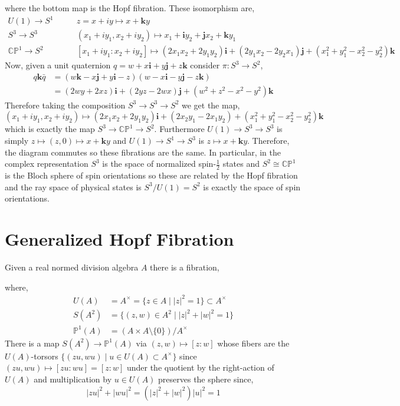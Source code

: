 \documentclass[12pt]{extarticle}
\theoremstyle{definition}
\renewcommand{\bf}[1]{\mathbf{#1}}
\renewcommand{\P}{\mathbb{P}}
\newcommand{\CP}{\mathbb{CP}}
\begin{document}
where the bottom map is the Hopf fibration. These isomorphism are,
\begin{align*}
U(1) \to S^1 \quad & \quad z = x + i y \mapsto x + \bf{k} y 
\\
S^3 \to S^3 \quad & \quad (x_1 + i y_1, x_2 + i y_2) \mapsto x_1 + \bf{i} y_2 + \bf{j} x_2 + \bf{k} y_1
\\
\CP^1 \to S^2 \quad & \quad [x_1 + i y_1 : x_2 + i y_2] \mapsto (2 x_1 x_2 + 2 y_1 y_2) \bf{i} + (2 y_1 x_2 - 2 y_2 x_1) \bf{j} +  (x_1^2 + y_1^2 - x_2^2 - y_2^2) \bf{k}
\end{align*}
Now, given a unit quaternion $q = w + x \bf{i}  + y \bf{j}  + z \bf{k}$ consider $\pi  : S^3 \to S^2$,
\begin{align*}
q \bf{k} \bar{q} & = (w \bf{k} - x \bf{j} + y \bf{i} - z) (w - x \bf{i} - y \bf{j} - z \bf{k})
\\
& = (2 w y + 2 x z) \bf{i} + (2 yz - 2 w x) \bf{j} + (w^2 + z^2 - x^2 - y^2) \bf{k}
\end{align*} 
Therefore taking the composition $S^3 \to S^3 \to S^2$ we get the map,
\[ (x_1 + i y_1, x_2 + i y_2) \mapsto (2 x_1 x_2 + 2 y_1 y_2) \bf{i} + (2 x_2 y_1 - 2 x_1 y_2) + (x_1^2 + y_1^2 - x_2^2 - y_2^2) \bf{k}  \]
which is exactly the map $S^3 \to \CP^1 \to S^2$. Furthermore $U(1) \to S^3 \to S^3$ is simply $z \mapsto (z, 0) \mapsto x + \bf{k} y$ and $U(1) \to S^1 \to S^3$ is $z \mapsto x + \bf{k} y$. Therefore, the diagram commutes so these fibrations are the same. In particular, in the complex representation $S^3$ is the space of normalized spin-$\tfrac{1}{2}$ states and $S^2 \cong \CP^1$ is the Bloch sphere of spin orientations so these are related by the Hopf fibration and the ray space of physical states is $S^3 / U(1) = S^2$ is exactly the space of spin orientations. 

\section{Generalized Hopf Fibration}

Given a real normed division algebra $A$ there is a fibration,
\begin{center}
\end{center} 
where,
\begin{align*}
U(A) & = A^\times = \{ z \in A \mid |z|^2 = 1 \} \subset A^\times
\\
S(A^2) & = \{ (z,w) \in A^2 \mid |z|^2 + |w|^2 = 1 \} 
\\
\P^1(A) & = (A \times A \setminus \{0\}) / A^\times
\end{align*} 
There is a map $S(A^2) \to \P^1(A)$ via $(z, w) \mapsto [z : w]$ whose fibers are the $U(A)$-torsors $\{ (z u, w u) \mid u \in U(A) \subset A^\times \}$ since $(z u, w u) \mapsto [z u : w u] = [z : w]$ under the quotient by the right-action of $U(A)$ and multiplication by $u \in U(A)$ preserves the sphere since,
\[ |zu|^2 + |wu|^2 = (|z|^2 + |w|^2)|u|^2 = 1 \]
\end{document}
